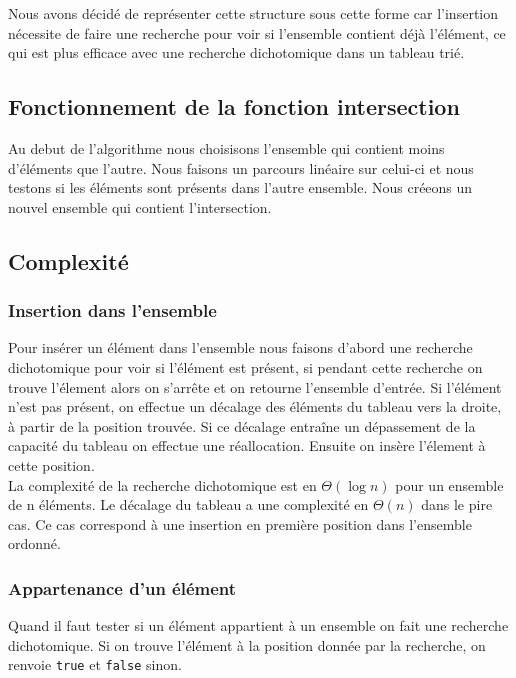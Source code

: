\documentclass[11pt]{article}
\begin{document}
    Nous avons décidé de représenter cette structure sous cette forme
    car l'insertion nécessite de faire une recherche
    pour voir si l'ensemble contient déjà l'élément, ce qui est plus
    efficace avec une recherche dichotomique dans un tableau trié.

    \subsection{Fonctionnement de la fonction intersection}
    Au debut de l'algorithme nous choisisons l'ensemble qui contient moins
    d'éléments que l'autre. Nous faisons un parcours linéaire sur celui-ci
    et nous testons si les éléments sont présents dans l'autre ensemble.
    Nous créeons un nouvel ensemble qui contient l'intersection.

    \subsection{Complexité}

        \subsubsection{Insertion dans l'ensemble}
        Pour insérer un élément dans l'ensemble nous faisons d'abord une
        recherche dichotomique pour voir si l'élément est présent, si
        pendant cette recherche on trouve l'élement alors on s'arrête et
        on retourne l'ensemble d'entrée. Si l'élément n'est pas présent,
        on effectue un décalage des éléments du tableau vers la droite,
        à partir de la position trouvée. Si ce décalage entraîne un dépassement
        de la capacité du tableau on effectue une réallocation.
        Ensuite on insère l'élement à cette position.\\

        La complexité de la recherche dichotomique est en $\Theta(\log{}n)$ pour
        un ensemble de n éléments. Le décalage du tableau a une complexité en
        $\Theta(n)$ dans le pire cas. Ce cas correspond à une insertion
        en première position dans l'ensemble ordonné.

        \subsubsection{Appartenance d'un élément}
        Quand il faut tester si un élément appartient à un ensemble on fait
        une recherche dichotomique. Si on trouve l'élément à la position donnée
        par la recherche, on renvoie \texttt{true} et \texttt{false} sinon.\\
\end{document}
